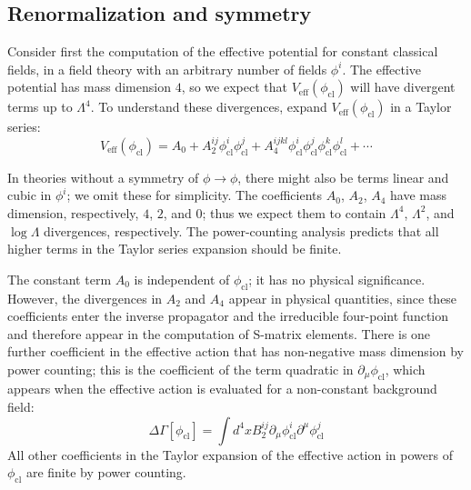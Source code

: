 \subsection{Renormalization and symmetry}
Consider first the computation of the effective potential for constant classical fields, in a field theory with an arbitrary number of fields $\phi^i$. The effective potential has mass dimension $4$, so we expect that $V_{\mathrm{eff}}(\phi_{\mathrm{cl}})$ will have divergent terms up to $\Lambda^4$. To understand these divergences,
expand $V_{\mathrm{eff}}(\phi_{\mathrm{cl}})$ in a Taylor series:
\[V_{\mathrm{eff}}(\phi_{\mathrm{cl}}) = A_0 + A_2^{ij}\phi_{\mathrm{cl}}^i \phi_{\mathrm{cl}}^j + A_4^{ijkl} \phi_{\mathrm{cl}}^i \phi_{\mathrm{cl}}^j \phi_{\mathrm{cl}}^k \phi_{\mathrm{cl}}^l + \cdots\]

In theories without a symmetry of $\phi \to \phi$, there might also be terms linear and cubic in $\phi^i$; we omit these for simplicity. The coefficients $A_0$, $A_2$, $A_4$ have mass dimension, respectively, $4$, $2$, and $0$; thus we expect them to contain $\Lambda^4$, $\Lambda^2$, and $\log \Lambda$ divergences, respectively. The power-counting analysis predicts that all higher terms in the Taylor series expansion should be finite.

The constant term $A_0$ is independent of $\phi_{\mathrm{cl}}$; it has no physical significance. However, the divergences in $A_2$ and $A_4$ appear in physical quantities, since these coefficients enter the inverse propagator and the irreducible four-point function and therefore appear in the computation of S-matrix elements. There is one further coefficient in the effective action that has non-negative mass dimension by power counting; this is the coefficient of the term quadratic in $\partial_{\mu} \phi_{\mathrm{cl}}$, which appears when the effective action is evaluated for a non-constant background field:
\[\Delta \Gamma [\phi_{\mathrm{cl}}] = \int d^4x B_2^{ij} \partial_{\mu} \phi_{\mathrm{cl}}^i \partial^{\mu} \phi_{\mathrm{cl}}^j\]
All other coefficients in the Taylor expansion of the effective action in powers of $\phi_{\mathrm{cl}}$ are finite by power counting.

